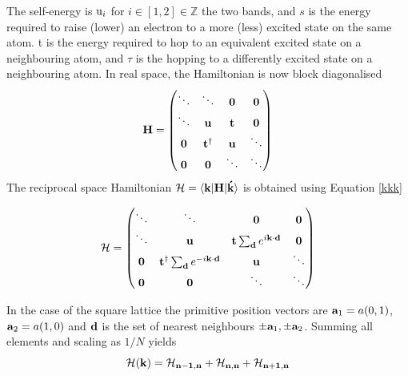 \documentclass[a4paper, 12pt]{article}
\begin{document}
	The self-energy is ${\rm u}_i$ for $i \in [1,2] \in \mathbb{Z}$ the two bands, and $s$ is the energy required to raise (lower) an electron to a more (less) excited state on the same atom. t is the energy required to hop to an equivalent excited state on a neighbouring atom, and $\tau$ is the hopping to a differently excited state on a neighbouring atom. In real space, the Hamiltonian is now block diagonalised
	\begin{equation}
	\bf	H = \begin{pmatrix} \ddots&\ddots& \bf 0&\bf 0\\\ddots&\bf u &\bf t&\bf 0\\\bf 0&\bf t^\dagger&\bf u&\ddots\\\bf 0&\bf 0&\ddots&\ddots\end{pmatrix}
	\end{equation}
	The reciprocal space Hamiltonian $\mathcal{H}=\langle {\bf k}|\bf H|{\bf \acute{k}} \rangle$ is obtained using Equation \eqref{kkk} 

	\begin{equation}
		\mathcal{H} = \begin{pmatrix} \ddots&\ddots& \bf 0&\bf 0\\\ddots&\bf u &{\bf t}\sum_{\bf d} e^{i\bf k \cdot d}&\bf 0\\\bf 0&{\bf t}^\dagger\sum_{\bf d} e^{-i\bf k \cdot d}&\bf u&\ddots\\\bf 0&\bf 0&\ddots&\ddots\end{pmatrix}
	\end{equation}

	In the case of the square lattice the primitive position vectors are ${\bf a}_1 = a(0,1)$, \quad ${\bf a}_2 = a(1,0)$ and ${\bf d}$ is the set of nearest neighbours $\pm {\bf a}_1, \pm {\bf a}_2$.
Summing all elements and scaling as $1/N$ yields
	\begin{equation}\label{H_0}
		\mathcal{H}(\bf k) = \mathcal{H}_{n-1,n} + \mathcal{H}_{n,n} + \mathcal{H}_{n+1,n}
	\end{equation}
\end{document}
